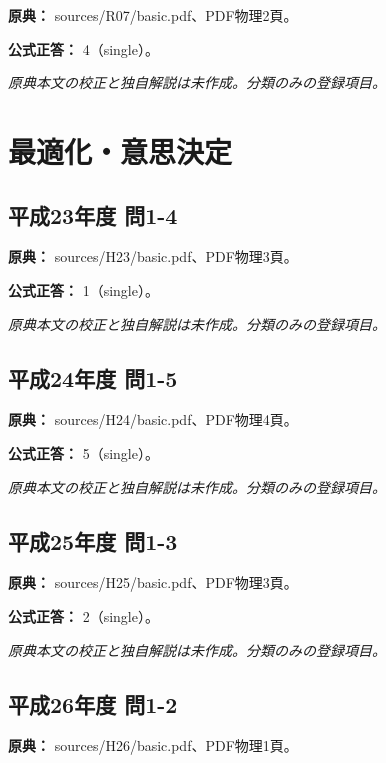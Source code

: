 \noindent\textbf{原典：} sources/R07/basic.pdf、PDF物理2頁。

\textbf{公式正答：} 4（single）。

\par\textit{原典本文の校正と独自解説は未作成。分類のみの登録項目。}

\section{最適化・意思決定}

\subsection{平成23年度 問1-4}
\label{q:h23-reg-basic-1-4}

\noindent\textbf{原典：} sources/H23/basic.pdf、PDF物理3頁。

\textbf{公式正答：} 1（single）。

\par\textit{原典本文の校正と独自解説は未作成。分類のみの登録項目。}

\subsection{平成24年度 問1-5}
\label{q:h24-reg-basic-1-5}

\noindent\textbf{原典：} sources/H24/basic.pdf、PDF物理4頁。

\textbf{公式正答：} 5（single）。

\par\textit{原典本文の校正と独自解説は未作成。分類のみの登録項目。}

\subsection{平成25年度 問1-3}
\label{q:h25-reg-basic-1-3}

\noindent\textbf{原典：} sources/H25/basic.pdf、PDF物理3頁。

\textbf{公式正答：} 2（single）。

\par\textit{原典本文の校正と独自解説は未作成。分類のみの登録項目。}

\subsection{平成26年度 問1-2}
\label{q:h26-reg-basic-1-2}

\noindent\textbf{原典：} sources/H26/basic.pdf、PDF物理1頁。

